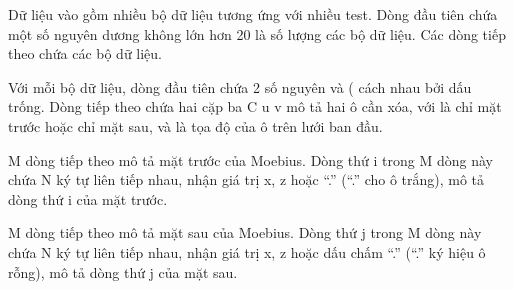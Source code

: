 Dữ liệu vào gồm nhiều bộ dữ liệu tương ứng với nhiều test. Dòng đầu tiên chứa một số nguyên dương không lớn hơn 20 là số lượng các bộ dữ liệu. Các dòng tiếp theo chứa các bộ dữ liệu.  

   Với mỗi bộ dữ liệu, dòng đầu tiên chứa 2 số nguyên   và   (  cách nhau bởi dấu trống. Dòng tiếp theo chứa hai cặp ba C u v mô tả hai ô cần xóa, với   là   chỉ mặt trước hoặc   chỉ mặt sau,    và    là tọa độ của ô trên lưới ban đầu.  

   M dòng tiếp theo mô tả mặt trước của Moebius. Dòng thứ i trong M dòng này chứa N ký tự liên tiếp nhau, nhận giá trị x, z hoặc “.” (“.” cho ô trắng), mô tả dòng thứ i của mặt trước.  

   M dòng tiếp theo mô tả mặt sau của Moebius. Dòng thứ j trong M dòng này chứa N ký tự liên tiếp nhau, nhận giá trị x, z hoặc dấu chấm “.” (“.” ký hiệu ô rỗng), mô tả dòng thứ j của mặt sau.  

\